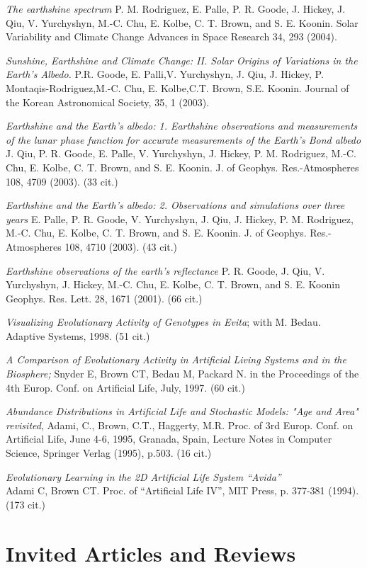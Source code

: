 \documentclass[margin,line]{resume}
\begin{document}
\begin{resume}
{\em The earthshine spectrum}
P. M. Rodriguez, E. Palle, P. R. Goode, J. Hickey, J. Qiu, V. Yurchyshyn, M.-C. Chu, E. Kolbe, C. T. Brown, and S. E. Koonin.
Solar Variability and Climate Change Advances in Space Research 34, 293 (2004).

{\em Sunshine, Earthshine and Climate Change: II. Solar Origins of Variations in the Earth's Albedo.}  P.R. Goode, E. Palli,V. Yurchyshyn, J. Qiu,
 J. Hickey, P. Montaqis-Rodriguez,M.-C. Chu,
 E. Kolbe,C.T. Brown, S.E. Koonin.
Journal of the Korean Astronomical Society, 35, 1 (2003).

{\em Earthshine and the Earth's albedo: 1. Earthshine observations and measurements of the lunar phase function for accurate measurements of the Earth's Bond albedo}
J. Qiu, P. R. Goode, E. Palle, V. Yurchyshyn, J. Hickey, P. M. Rodriguez, M.-C. Chu, E. Kolbe, C. T. Brown, and S. E. Koonin.
J. of Geophys. Res.-Atmospheres 108, 4709 (2003).  (33 cit.)

{\em Earthshine and the Earth's albedo: 2. Observations and simulations over three years}
 E. Palle, P. R. Goode, V. Yurchyshyn, J. Qiu, J. Hickey, P. M. Rodriguez, M.-C. Chu, E. Kolbe, C. T. Brown, and S. E. Koonin.
J. of Geophys. Res.-Atmospheres 108, 4710 (2003). (43 cit.)


{\em Earthshine observations of the earth's reflectance}
P. R. Goode, J. Qiu, V. Yurchyshyn, J. Hickey, M.-C. Chu, E. Kolbe, C. T. Brown, and S. E. Koonin
Geophys. Res. Lett. 28, 1671 (2001). (66 cit.)

{\em Visualizing Evolutionary Activity of Genotypes in Evita};
with M. Bedau.  Adaptive Systems, 1998. (51 cit.)

{\em A Comparison of Evolutionary Activity in Artificial Living Systems and in the 
	Biosphere;} Snyder E, Brown CT, Bedau M, Packard N.
in the Proceedings of the 4th Europ. Conf. on 
Artificial Life, July, 1997.  (60 cit.)

{\em Abundance Distributions in Artificial Life and Stochastic Models: "Age and
Area" revisited}, Adami, C., Brown, C.T., Haggerty, M.R.
Proc. of 3rd Europ. Conf. on Artificial Life, June 4-6, 1995,
Granada, Spain, Lecture Notes in Computer Science, Springer Verlag (1995),
p.503. (16 cit.)

{\em Evolutionary Learning in the 2D Artificial Life System ``Avida''}\\
Adami C, Brown CT. Proc. of ``Artificial Life IV'', MIT Press, p. 377-381
(1994).  (173 cit.)

\section{\mysidestyle Invited Articles and Reviews}


\end{resume}
\end{document}

